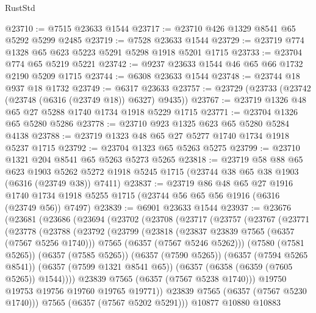 \begin{lexlean}{RustStd}
\begin{coremodule}
@23710 := @7515 @23633 @1544
@23717 := @23710 @426 @1329 @8541 @65 @5292 @5299 @2485
@23719 := @7528 @23633 @1544
@23729 := @23719 @774 @1328 @65 @623 @5223 @5291 @5298 @1918 @5201 @1715
@23733 := @23704 @774 @65 @5219 @5221
@23742 := @9237 @23633 @1544 @46 @65 @66 @1732 @2190 @5209 @1715
@23744 := @6308 @23633 @1544
@23748 := @23744 @18 @937 @18 @1732
@23749 := @6317 @23633
@23757 := @23729 (@23733 (@23742 (@23748 (@6316 (@23749 @18)) @6327) @9435))
@23767 := @23719 @1326 @48 @65 @27 @5288 @1740 @1734 @1918 @5229 @1715
@23771 := @23704 @1326 @65 @5280 @5286
@23778 := @23710 @923 @1325 @623 @65 @5280 @5284 @4138
@23788 := @23719 @1323 @48 @65 @27 @5277 @1740 @1734 @1918 @5237 @1715
@23792 := @23704 @1323 @65 @5263 @5275
@23799 := @23710 @1321 @204 @8541 @65 @5263 @5273 @5265
@23818 := @23719
    @58
    @88
    @65
    @623
    @1903
    @5262
    @5272
    @1918
    @5245
    @1715
    (@23744 @38 @65 @38 @1903 (@6316 (@23749 @38)) @7411)
@23837 := @23719
    @86
    @48
    @65
    @27
    @1916
    @1740
    @1734
    @1918
    @5255
    @1715
    (@23744 @56 @65 @56 @1916 (@6316 (@23749 @56)) @7497)
@23839 := @6901 @23633 @1544
@23937 := @23676
    (@23681
      (@23686
        (@23694
          (@23702
            (@23708
              (@23717
                (@23757
                  (@23767
                    (@23771
                      (@23778
                        (@23788
                          (@23792
                            (@23799
                              (@23818
                                (@23837 @23839 @7565 (@6357 (@7567 @5256 @1740)))
                                @7565
                                (@6357 (@7567 @5246 @5262)))
                              (@7580 (@7581 @5265))
                              (@6357 (@7585 @5265))
                              (@6357 (@7590 @5265))
                              (@6357 (@7594 @5265 @8541))
                              (@6357 (@7599 @1321 @8541 @65))
                              (@6357 (@6358 (@6359 (@7605 @5265)) @1544))))
                          @23839
                          @7565
                          (@6357 (@7567 @5238 @1740)))
                        @19750
                        @19753
                        @19756
                        @19760
                        @19765
                        @19771))
                    @23839
                    @7565
                    (@6357 (@7567 @5230 @1740)))
                  @7565
                  (@6357 (@7567 @5202 @5291)))
                @10877
                @10880
                @10883

\end{coremodule}
\end{lexlean}
